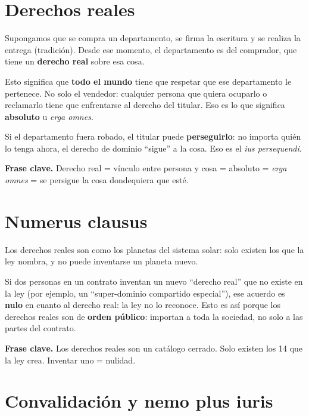 \documentclass[12pt,oneside]{book}
\begin{document}
\section{Derechos reales}

Supongamos que se compra un departamento, se firma la escritura y se realiza la entrega (tradici\'on). Desde ese momento, el departamento es del comprador, que tiene un \textbf{derecho real} sobre esa cosa.

Esto significa que \textbf{todo el mundo} tiene que respetar que ese departamento le pertenece. No solo el vendedor: cualquier persona que quiera ocuparlo o reclamarlo tiene que enfrentarse al derecho del titular. Eso es lo que significa \textbf{absoluto} u \textit{erga omnes}.

Si el departamento fuera robado, el titular puede \textbf{perseguirlo}: no importa qui\'en lo tenga ahora, el derecho de dominio ``sigue'' a la cosa. Eso es el \textit{ius persequendi}.

\begin{note}
\textbf{Frase clave.} Derecho real = v\'inculo entre persona y cosa = absoluto = \textit{erga omnes} = se persigue la cosa dondequiera que est\'e.
\end{note}

\section{Numerus clausus}

Los derechos reales son como los planetas del sistema solar: solo existen los que la ley nombra, y no puede inventarse un planeta nuevo.

Si dos personas en un contrato inventan un nuevo ``derecho real'' que no existe en la ley (por ejemplo, un ``super-dominio compartido especial''), ese acuerdo es \textbf{nulo} en cuanto al derecho real: la ley no lo reconoce. Esto es as\'i porque los derechos reales son de \textbf{orden p\'ublico}: importan a toda la sociedad, no solo a las partes del contrato.

\begin{note}
\textbf{Frase clave.} Los derechos reales son un cat\'alogo cerrado. Solo existen los 14 que la ley crea. Inventar uno = nulidad.
\end{note}

\section{Convalidaci\'on y nemo plus iuris}
\end{document}
